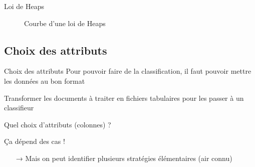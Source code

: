 \documentclass[hyperref={unicode}, xcolor={svgnames}, french]{beamer}
\begin{document}
\begin{frame}[label=heapslawgraph]{Loi de Heaps}
    \begin{figure}
        \tikzset{external/export=true}
        \caption{Courbe d'une loi de Heaps}
    \end{figure}
\end{frame}
%


\subsection{Choix des attributs}
\begin{frame}{Choix des attributs}
    Pour pouvoir faire de la classification, il faut pouvoir mettre les données au bon format
    \begin{description}[<+->][*]
        \item[Objectif] Transformer les documents à traiter en fichiers tabulaires pour les passer à un classifieur
        \item[Problème] Quel choix d'attributs (colonnes) ?
        \item[Solution] Ça dépend des cas !
            \begin{itemize}
                \item[→] Mais on peut identifier plusieurs stratégies élémentaires (air connu)
            \end{itemize}
    \end{description}
\end{frame}
\end{document}
